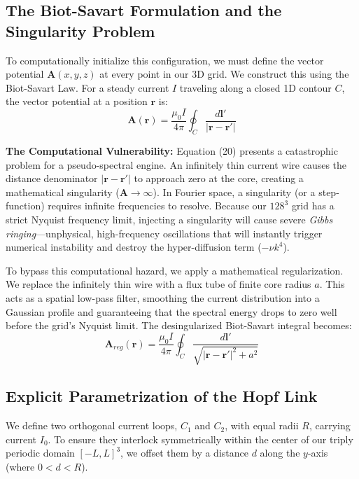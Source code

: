 \documentclass[11pt, a4paper]{article}
\begin{document}
\subsection{The Biot-Savart Formulation and the Singularity Problem}
To computationally initialize this configuration, we must define the vector potential $\mathbf{A}(x,y,z)$ at every point in our 3D grid. We construct this using the Biot-Savart Law. For a steady current $I$ traveling along a closed 1D contour $C$, the vector potential at a position $\mathbf{r}$ is:
\begin{equation}
    \mathbf{A}(\mathbf{r}) = \frac{\mu_0 I}{4\pi} \oint_C \frac{d\mathbf{l}'}{|\mathbf{r} - \mathbf{r}'|}
\end{equation}

\textbf{The Computational Vulnerability:} Equation (20) presents a catastrophic problem for a pseudo-spectral engine. An infinitely thin current wire causes the distance denominator $|\mathbf{r} - \mathbf{r}'|$ to approach zero at the core, creating a mathematical singularity ($\mathbf{A} \to \infty$). In Fourier space, a singularity (or a step-function) requires infinite frequencies to resolve. Because our $128^3$ grid has a strict Nyquist frequency limit, injecting a singularity will cause severe \textit{Gibbs ringing}—unphysical, high-frequency oscillations that will instantly trigger numerical instability and destroy the hyper-diffusion term ($-\nu k^4$).

To bypass this computational hazard, we apply a mathematical regularization. We replace the infinitely thin wire with a flux tube of finite core radius $a$. This acts as a spatial low-pass filter, smoothing the current distribution into a Gaussian profile and guaranteeing that the spectral energy drops to zero well before the grid's Nyquist limit. The desingularized Biot-Savart integral becomes:
\begin{equation}
    \mathbf{A}_{reg}(\mathbf{r}) = \frac{\mu_0 I}{4\pi} \oint_C \frac{d\mathbf{l}'}{\sqrt{|\mathbf{r} - \mathbf{r}'|^2 + a^2}}
\end{equation}

\subsection{Explicit Parametrization of the Hopf Link}
We define two orthogonal current loops, $C_1$ and $C_2$, with equal radii $R$, carrying current $I_0$. To ensure they interlock symmetrically within the center of our triply periodic domain $[-L, L]^3$, we offset them by a distance $d$ along the $y$-axis (where $0 < d < R$).
\end{document}
